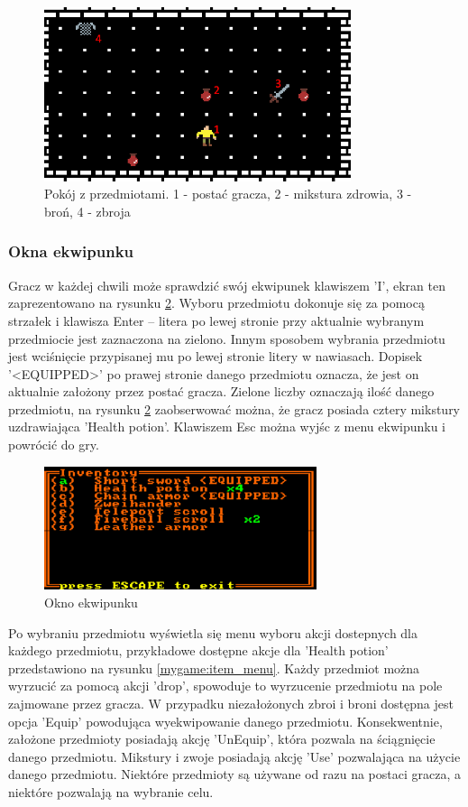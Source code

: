 \documentclass[12pt,twoside]{article}
\begin{document}
\FloatBarrier
\begin{figure}[h]
	\centering
	\includegraphics[width=9cm]{images/mygame/item_room.png}
	\caption{Pokój z przedmiotami. 1 - postać gracza, 2 - mikstura zdrowia, 3 - broń, 4 - zbroja }
	\label{mygame:item_room}
\end{figure}
\FloatBarrier


\subsubsection{Okna ekwipunku}
Gracz w każdej chwili może sprawdzić swój ekwipunek klawiszem 'I', ekran ten zaprezentowano na rysunku \ref{mygame:inv}. Wyboru przedmiotu dokonuje się za pomocą strzałek i klawisza Enter -- litera po lewej stronie przy aktualnie wybranym przedmiocie jest zaznaczona na zielono. Innym sposobem wybrania przedmiotu jest wciśnięcie przypisanej mu po lewej stronie litery w nawiasach. Dopisek '<EQUIPPED>' po prawej stronie danego przedmiotu oznacza, że jest on aktualnie założony przez postać gracza. Zielone liczby oznaczają ilość danego przedmiotu, na rysunku \ref{mygame:inv}  zaobserwować można, że gracz posiada cztery mikstury uzdrawiająca 'Health potion'. Klawiszem Esc można wyjśc z menu ekwipunku i powrócić do gry.

\FloatBarrier
\begin{figure}[h]
	\centering
	\includegraphics[width=8cm]{images/mygame/inv.png}
	\caption{Okno ekwipunku}
	\label{mygame:inv}
\end{figure}
\FloatBarrier

Po wybraniu przedmiotu wyświetla się menu wyboru akcji dostepnych dla każdego przedmiotu, przykładowe dostępne akcje dla 'Health potion' przedstawiono na rysunku \ref{mygame:item_menu}. Każdy przedmiot można wyrzucić za pomocą akcji 'drop', spowoduje to wyrzucenie przedmiotu na pole zajmowane przez gracza. W przypadku niezałożonych zbroi i broni dostępna jest opcja 'Equip' powodująca wyekwipowanie danego przedmiotu. Konsekwentnie, założone przedmioty posiadają akcję 'UnEquip', która pozwala na ściągnięcie danego przedmiotu. Mikstury i zwoje posiadają akcję 'Use' pozwalająca na użycie danego przedmiotu. Niektóre przedmioty są używane od razu na postaci gracza, a niektóre pozwalają na wybranie celu.
\end{document}
